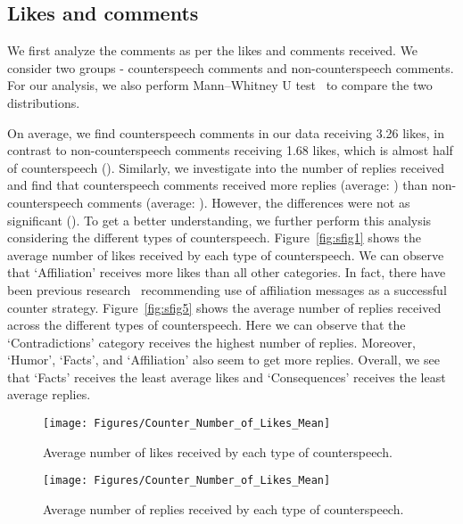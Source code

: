 \documentclass[11pt,a4paper]{article}
\newcommand{\TODO}[1]{\textcolor{red}{#1}}
\newcommand{\binny}[1]{\textcolor{blue}{[Binny: #1]}}
\begin{document}
{\subsection{Likes and comments}
We first analyze the comments as per the likes and comments received. We consider two groups - counterspeech comments and non-counterspeech comments. For our analysis, we also perform Mann–Whitney U test~\cite{mann1947test} to compare the two distributions. 




On average, we find counterspeech comments in our data receiving 3.26 likes, in contrast to non-counterspeech comments receiving 1.68 likes, which is almost half of counterspeech (). Similarly, we investigate into the number of replies received and find that counterspeech comments received more replies (average: ) than non-counterspeech comments (average: ). However, the differences were not as significant (). To get a better understanding, we further perform this analysis considering the different types of counterspeech. Figure~\ref{fig:sfig1} shows the average number of likes received by each type of counterspeech. We can observe that `Affiliation' receives more likes than all other categories. \iffalse\TODO{PG: but figure mentions identification}\binny{Corrected.}\fi In fact, there have been previous research~\citet{susan2016successfullcounter} recommending use of affiliation messages as a successful counter strategy.
Figure~\ref{fig:sfig5} shows the average number of replies received across the different types of counterspeech. Here we can observe that the `Contradictions' category receives the highest number of replies. Moreover, `Humor', `Facts', and `Affiliation' also seem to get more replies. Overall, we see that `Facts' receives the least average likes and `Consequences' receives the least average replies.\fi
\iffalse
\begin{figure*}[h]

	\begin{subfigure}[b]{0.45\textwidth}
		\texttt{[image: Figures/Counter\_Number\_of\_Likes\_Mean]}
		\caption{Average number of likes received by each type of counterspeech.}
		\label{fig:counter_num_likes}
	\end{subfigure}
	\qquad
	\centering	
	\begin{subfigure}[b]{0.45\textwidth}
		\texttt{[image: Figures/Counter\_Number\_of\_Likes\_Mean]}
		\caption{Average number of replies received by each type of counterspeech.}
		\label{fig:counter_num_replies}
	\end{subfigure}


\end{figure*}}
\end{document}
